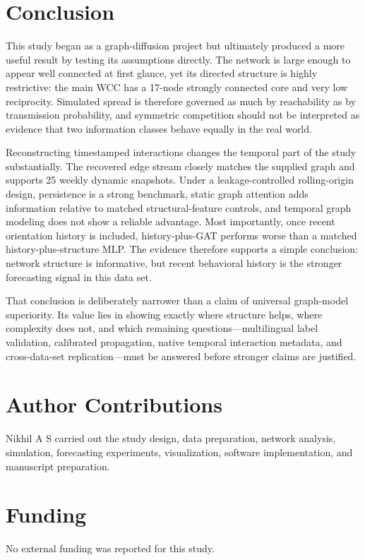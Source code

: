 \documentclass[11pt,a4paper]{article}
\begin{document}
\section{Conclusion}
This study began as a graph-diffusion project but ultimately produced a more useful result by testing its assumptions directly. The network is large enough to appear well connected at first glance, yet its directed structure is highly restrictive: the main WCC has a 17-node strongly connected core and very low reciprocity. Simulated spread is therefore governed as much by reachability as by transmission probability, and symmetric competition should not be interpreted as evidence that two information classes behave equally in the real world.

Reconstructing timestamped interactions changes the temporal part of the study substantially. The recovered edge stream closely matches the supplied graph and supports 25 weekly dynamic snapshots. Under a leakage-controlled rolling-origin design, persistence is a strong benchmark, static graph attention adds information relative to matched structural-feature controls, and temporal graph modeling does not show a reliable advantage. Most importantly, once recent orientation history is included, history-plus-GAT performs worse than a matched history-plus-structure MLP. The evidence therefore supports a simple conclusion: network structure is informative, but recent behavioral history is the stronger forecasting signal in this data set.

That conclusion is deliberately narrower than a claim of universal graph-model superiority. Its value lies in showing exactly where structure helps, where complexity does not, and which remaining questions---multilingual label validation, calibrated propagation, native temporal interaction metadata, and cross-data-set replication---must be answered before stronger claims are justified.

\section*{Author Contributions}
Nikhil A S carried out the study design, data preparation, network analysis, simulation, forecasting experiments, visualization, software implementation, and manuscript preparation.

\section*{Funding}
No external funding was reported for this study.
\end{document}
